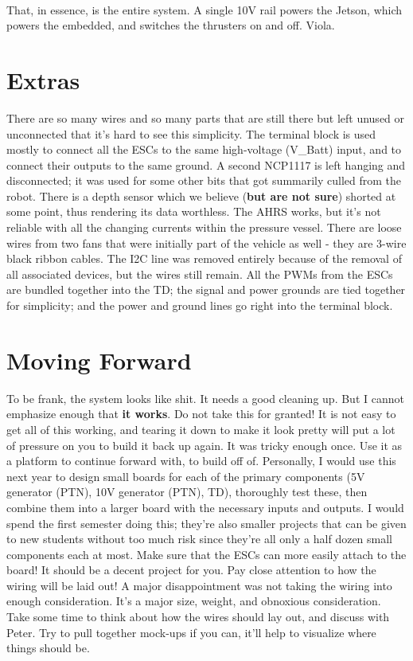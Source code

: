 \documentclass{article}
\begin{document}
\paragraph{}
That, in essence, is the entire system. A single 10V rail powers the Jetson, which powers the embedded, and switches the thrusters on and off. Viola.

\section{Extras}
There are so many wires and so many parts that are still there but left unused or unconnected that it's hard to see this simplicity. The terminal block is used mostly to connect all the ESCs to the same high-voltage (V\_Batt) input, and to connect their outputs to the same ground. A second NCP1117 is left hanging and disconnected; it was used for some other bits that got summarily culled from the robot. There is a depth sensor which we believe (\textbf{but are not sure}) shorted at some point, thus rendering its data worthless. The AHRS works, but it's not reliable with all the changing currents within the pressure vessel. There are loose wires from two fans that were initially part of the vehicle as well - they are 3-wire black ribbon cables. The I2C line was removed entirely because of the removal of all associated devices, but the wires still remain. All the PWMs from the ESCs are bundled together into the TD; the signal and power grounds are tied together for simplicity; and the power and ground lines go right into the terminal block. 

\section{Moving Forward}
To be frank, the system looks like shit. It needs a good cleaning up. But I cannot emphasize enough that \textbf{it works}. Do not take this for granted! It is not easy to get all of this working, and tearing it down to make it look pretty will put a lot of pressure on you to build it back up again. It was tricky enough once. Use it as a platform to continue forward with, to build off of. Personally, I would use this next year to design small boards for each of the primary components (5V generator (PTN), 10V generator (PTN), TD), thoroughly test these, then combine them into a larger board with the necessary inputs and outputs. I would spend the first semester doing this; they're also smaller projects that can be given to new students without too much risk since they're all only a half dozen small components each at most. Make sure that the ESCs can more easily attach to the board! It should be a decent project for you. Pay close attention to how the wiring will be laid out! A major disappointment was not taking the wiring into enough consideration. It's a major size, weight, and obnoxious consideration. Take some time to think about how the wires should lay out, and discuss with Peter. Try to pull together mock-ups if you can, it'll help to visualize where things should be. 
\end{document}
